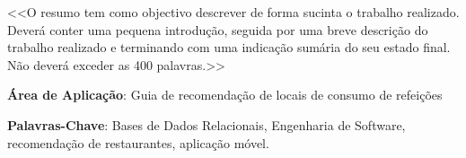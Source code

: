 \documentclass[a4paper,12pt]{scrreprt}
\begin{document}

\makecover








\renewenvironment{abstract}
 {\par\noindent\textbf{\Large\abstractname}\par\bigskip}
 {}

\begin{flushleft}
\begin{abstract}
    <<O resumo tem como objectivo descrever de forma sucinta o trabalho realizado. Deverá conter uma pequena introdução, seguida por uma breve descrição do trabalho realizado e terminando com uma indicação sumária do seu estado final. Não deverá exceder as 400 palavras.>> 
    \par \textbf{Área de Aplicação}: Guia de recomendação de locais de consumo de refeições 
    \par \textbf{Palavras-Chave}: Bases de Dados Relacionais, Engenharia de Software, recomendação de restaurantes, aplicação móvel.
\end{abstract}
\end{flushleft}


\pagebreak



\renewcommand{\contentsname}{Índice}

\tableofcontents

\pagebreak

\listoffigures

\pagebreak

\listoftables
\end{document}
